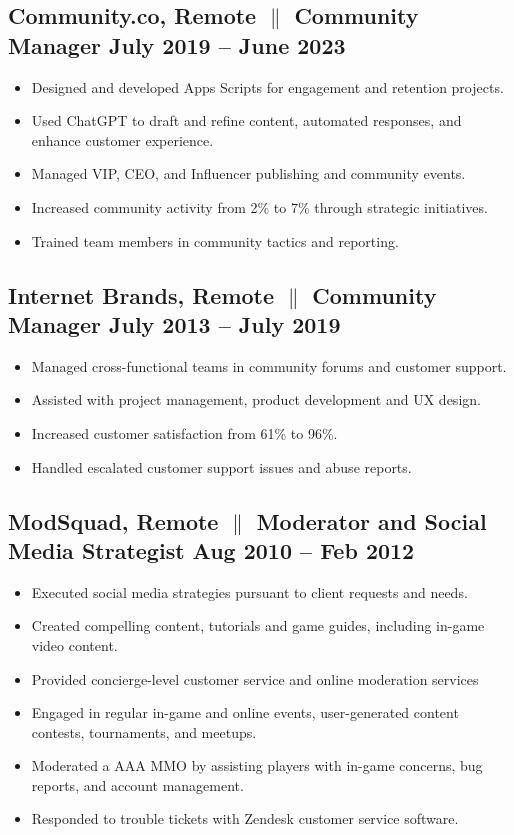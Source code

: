 \documentclass[a4paper,10pt]{article}
\begin{document}
\subsection{Community.co, Remote {$\parallel$}{ Community Manager} \hfill
      \textbf{July 2019 – June
            2023}}
\begin{itemize}
      \item Designed and developed Apps Scripts for engagement and retention
            projects.
      \item Used ChatGPT to draft and refine content, automated responses, and enhance customer experience.
      \item Managed VIP, CEO, and Influencer publishing and community
            events.
      \item Increased community activity from 2\% to 7\% through
            strategic
            initiatives.
      \item Trained team members in community tactics and reporting.
\end{itemize}

\subsection{Internet Brands, Remote {$\parallel$}{ Community Manager} \hfill
      \textbf{July 2013 – July
            2019}}
\begin{itemize}
      \item Managed cross-functional teams in community forums and customer support.
      \item Assisted with project management, product development and UX design.
      \item Increased customer satisfaction from 61\%
            to
            96\%.
      \item Handled escalated customer support issues and abuse reports.
\end{itemize}

\subsection{ModSquad, Remote {$\parallel$}{ Moderator and Social Media Strategist} \hfill
      \textbf{Aug 2010 – Feb
            2012}}
\begin{itemize}
      \item Executed social media strategies pursuant to client requests and needs.
\item Created compelling content, tutorials and game guides, including in-game video content.
\item Provided concierge-level customer service and online moderation services
\item Engaged in regular in-game and online events, user-generated content contests, tournaments, and meetups.
\item Moderated a AAA MMO by assisting players with in-game concerns, bug reports, and account management.
\item Responded to trouble tickets with Zendesk customer service software.
\end{itemize}
\end{document}

